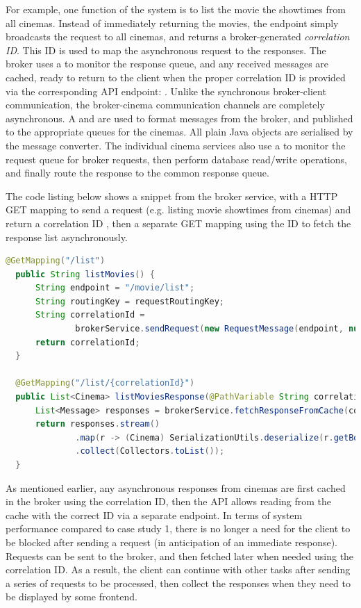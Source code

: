 For example, one function of the system is to list the movie the showtimes from all cinemas. Instead of immediately returning the movies, the  endpoint simply broadcasts the request to all cinemas, and returns a broker-generated \textit{correlation ID}. This ID is used to map the asynchronous request to the responses. The broker uses a  to monitor the response queue, and any received messages are cached, ready to return to the client when the proper correlation ID is provided via the corresponding API endpoint: . Unlike the synchronous broker-client communication, the broker-cinema communication channels are completely asynchronous. A  and  are used to format messages from the broker, and published to the appropriate queues for the cinemas. All plain Java objects are serialised by the message converter. The individual cinema services also use a  to monitor the request queue for broker requests, then perform database read/write operations, and finally route the response to the common response queue.

The code listing below shows a snippet from the broker service, with a HTTP GET mapping to send a request (e.g. listing movie showtimes from cinemas) and return a correlation ID , then a separate GET mapping using the ID to fetch the response list asynchronously.


\begin{lstlisting}[language=Java, caption=Code snippet from \code{MovieController.java} in \code{broker-service}]
  @GetMapping("/list")
  public String listMovies() {
      String endpoint = "/movie/list";
      String routingKey = requestRoutingKey;
      String correlationId =
              brokerService.sendRequest(new RequestMessage(endpoint, null), routingKey);
      return correlationId;
  }

  @GetMapping("/list/{correlationId}")
  public List<Cinema> listMoviesResponse(@PathVariable String correlationId) {
      List<Message> responses = brokerService.fetchResponseFromCache(correlationId);
      return responses.stream()
              .map(r -> (Cinema) SerializationUtils.deserialize(r.getBody()))
              .collect(Collectors.toList());
  }
\end{lstlisting}

As mentioned earlier, any asynchronous responses from cinemas are first cached in the broker using the correlation ID, then the API allows reading from the cache with the correct ID via a separate endpoint. In terms of system performance compared to case study 1, there is no longer a need for the client to be blocked after sending a request (in anticipation of an immediate response). Requests can be sent to the broker, and then fetched later when needed using the correlation ID. As a result, the client can continue with other tasks after sending a series of requests to be processed, then collect the responses when they need to be displayed by some frontend.


